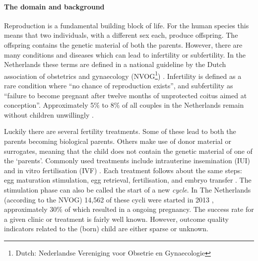 \paragraph{The domain and background}
Reproduction is a fundamental building block of life.
For the human species this means that two individuals, with a different sex each, produce offspring.
The offspring contains the genetic material of both the parents.
However, there are many conditions and diseases which can lead to infertility or subfertility.
In the Netherlands these terms are defined in a national guideline by the Dutch association of obstetrics and gynaecology (NVOG\footnote{Dutch: Nederlandse Vereniging voor Obsetrie en Gynaecologie}) \cite{subfertilityGuideline}.
Infertility is defined as a rare condition where ``no chance of reproduction exists'', 
and subfertility as ``failure to become pregnant after twelve months of unprotected coitus aimed at conception''.
Approximately 5\% to 8\% of all couples in the Netherlands remain without children unwillingly \cite{cbsStatistics, nhgStatistics}.

Luckily there are several fertility treatments.
Some of these lead to both the parents becoming biological parents. 
Others make use of donor material or surrogates, meaning that the child does not contain the genetic material of one of the `parents'.
Commonly used treatments include intrauterine insemination (IUI) and in vitro fertilisation (IVF) \cite{treatmentExplanation}.
Each treatment follows about the same steps: egg maturation stimulation, egg retrieval, fertilisation, and embryo transfer \cite{treatmentExplanation}.
The stimulation phase can also be called the start of a new \emph{cycle}. In The Netherlands (according to the NVOG) 14,562 of these cycli were started in 2013 \cite{ivfReportNVOG2013}, approximately 30\% of which resulted in a ongoing pregnancy.
The success rate for a given clinic or treatment is fairly well known.
However, outcome quality indicators related to the (born) child are either sparse or unknown.

